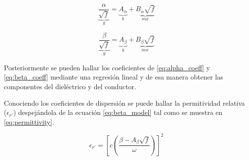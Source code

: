 \documentclass{article}   %
\newcommand*{\freq}{\mathord{\mathit{f}}}
\theoremstyle{mytheoremstyle}
\theoremstyle{mytheoremstyle}
\theoremstyle{myproblemstyle}
\begin{document}
\begin{minipage}{0.49\textwidth}
        \begin{equation}
            \underbrace{\frac{\alpha}{\sqrt{\freq}}}_{y} = \underbrace{A_{\alpha}}_{b} + \underbrace{B_{\alpha} \sqrt{\freq}}_{mx}
            \label{eq:alpha_coeff}
        \end{equation}

        \begin{equation}
            \underbrace{\frac{\beta}{\sqrt{\freq}}}_{y} = \underbrace{A_{\beta}}_{b} + \underbrace{B_{\beta} \sqrt{\freq}}_{mx}
            \label{eq:beta_coeff}
        \end{equation}

        Posteriormente se pueden hallar los coeficientes de \eqref{eq:alpha_coeff} y \eqref{eq:beta_coeff} mediante una regresión
        lineal y de esa manera obtener las componentes del dieléctrico y del conductor.

        Conociendo los coeficientes de dispersión se puede hallar la permitividad relativa ($\epsilon_{r'}$) despejándola de la ecuación 
        \eqref{eq:beta_model} tal como se muestra en \eqref{eq:permittivity}.

        \begin{equation}
            \epsilon_{r'} = \left[ c \left(\frac{\beta - A_{\beta} \sqrt{\freq}}{\omega} \right) \right]^2
            \label{eq:permittivity}
        \end{equation}

    \end{minipage}
    \hspace{0.38 cm}
\end{document}
